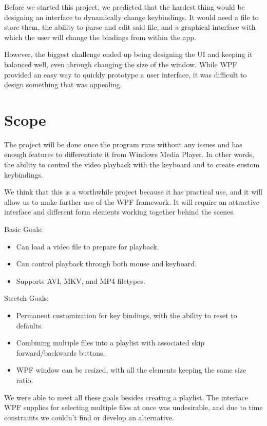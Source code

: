 \documentclass[10pt,conference,onecolumn,compsoc]{IEEEtran}
\begin{document}
Before we started this project, we predicted that the hardest thing would be designing an interface to dynamically change keybindings. It would need a file to store them, the ability to parse and edit said file, and a graphical interface with which the user will change the bindings from within the app. 

However, the biggest challenge ended up being designing the UI and keeping it balanced well, even through changing the size of the window. While WPF provided an easy way to quickly prototype a user interface, it was difficult to design something that was appealing. 
\section{Scope}


The project will be done once the program runs without any issues and has enough features to differentiate it from Windows Media Player. In other words, the ability to control the video playback with the keyboard and to create custom keybindings. 

We think that this is a worthwhile project because it has practical use, and it will allow us to make further use of the WPF framework. It will require an attractive interface and different form elements working together behind the scenes. 

Basic Goals:
\begin{itemize}
\item Can load a video file to prepare for playback.
\item Can control playback through both mouse and keyboard. 
\item Supports AVI, MKV, and MP4 filetypes. 
\end{itemize}

Stretch Goals:
\begin{itemize}

\item Permanent customization for key bindings, with the ability to reset to defaults. 
\item Combining multiple files into a playlist with associated skip forward/backwards buttons.
\item WPF window can be resized, with all the elements keeping the same size ratio. 
\end{itemize}

We were able to meet all these goals besides creating a playlist. The interface WPF supplies for selecting multiple files at once was undesirable, and due to time constraints we couldn't find or develop an alternative.
\end{document}
